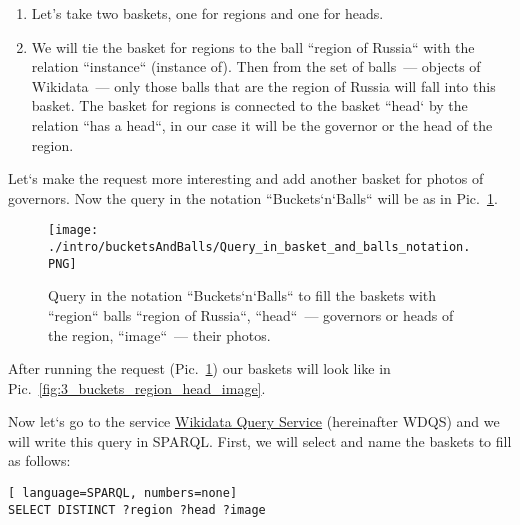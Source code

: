 \begin{enumerate}
    \item Let's take two baskets, one for regions and one for heads.
    \item We will tie the basket for regions to the ball ``region of Russia`` with the relation ``instance`` (instance of). Then from the set of balls~--- objects of Wikidata~--- only those balls that are the region of Russia will fall into this basket. The basket for regions is connected to the basket ``head` by the relation ``has a head``, in our case it will be the governor or the head of the region.
\end{enumerate}

Let`s make the request more interesting and add another basket for photos of governors. Now the query in the notation ``Buckets`n`Balls`` will be as in Pic.~\ref{fig:Query_in_basket_and_balls_notation}.

\begin{figure}[h!]
    \texttt{[image: ./intro/bucketsAndBalls/Query\_in\_basket\_and\_balls\_notation.PNG]}
    \caption{Query in the notation ``Buckets`n`Balls`` to fill the baskets with ``region`` balls ``region of Russia``, ``head``~--- governors or heads of the region, ``image``~--- their photos.}
	\label{fig:Query_in_basket_and_balls_notation}
\end{figure}

After running the request (Pic.~\ref{fig:Query_in_basket_and_balls_notation}) our baskets will look like in Pic.~\ref{fig:3_buckets_region_head_image}.

\begin{marginfigure}
	{
		\setlength{\fboxsep}{0pt}%
		\setlength{\fboxrule}{1pt}%
	}
    \caption{Baskets after running the request in Pic.~\ref{fig:Query_in_basket_and_balls_notation}. \textit{?region} these are the regions of Russia, \textit{?head} these are the heads, \textit{?image}~--- these are photos of heads.}
	\label{fig:3_buckets_region_head_image}
\end{marginfigure}

Now let`s go to the service \href{https://query.wikidata.org/}{Wikidata Query Service} 
(hereinafter WDQS) 
and we will write this query in SPARQL. First, we will select and name the baskets to fill as follows:

\begin{lstlisting}[ language=SPARQL, numbers=none]
SELECT DISTINCT ?region ?head ?image
\end{lstlisting}

